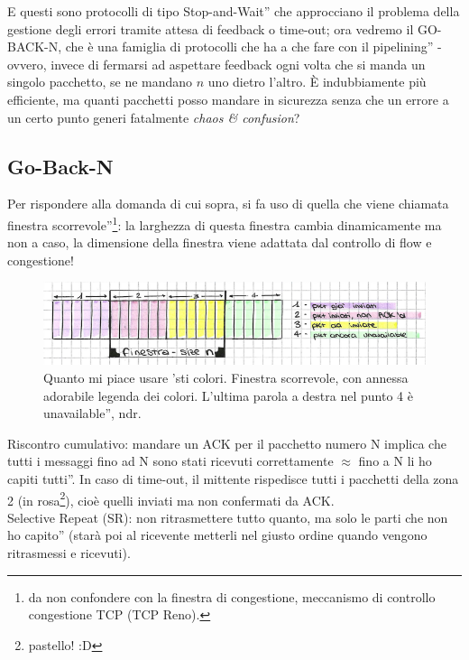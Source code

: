 \noindent E questi sono protocolli di tipo \openapex Stop-and-Wait'' che approcciano il problema della gestione degli errori tramite attesa di feedback o time-out; ora vedremo il GO-BACK-N, che è una famiglia di protocolli che ha a che fare con il \openapex pipelining'' - ovvero, invece di fermarsi ad aspettare feedback ogni volta che si manda un singolo pacchetto, se ne mandano $n$ uno dietro l'altro. È indubbiamente più efficiente, ma quanti pacchetti posso mandare in sicurezza senza che un errore a un certo punto generi fatalmente \textit{chaos \& confusion}?

\subsection*{Go-Back-N}
\noindent Per rispondere alla domanda di cui sopra, si fa uso di quella che viene chiamata \openapex finestra scorrevole''\footnote{da non confondere con la finestra di congestione, meccanismo di controllo congestione TCP (TCP Reno).}: la larghezza di questa finestra cambia dinamicamente ma non a caso, la dimensione della finestra viene adattata dal controllo di flow e congestione!

\begin{figure} [h]
    \centering
    \includegraphics[width=1\linewidth]{Figures//03/window.png}
    \caption{Quanto mi piace usare 'sti colori. Finestra scorrevole, con annessa adorabile legenda dei colori. L'ultima parola a destra nel punto 4 è \openapex unavailable'', ndr.}
    \label{fig:congwin}
\end{figure}

\noindent Riscontro cumulativo: mandare un ACK per il pacchetto numero N implica che tutti i messaggi fino ad N sono stati ricevuti correttamente $\approx$ \openapex fino a N li ho capiti tutti''. In caso di time-out, il mittente rispedisce tutti i pacchetti della zona 2 (in rosa\footnote{pastello! :D}), cioè quelli inviati ma non confermati da ACK.\\
\noindent Selective Repeat (SR): \openapex non ritrasmettere tutto quanto, ma solo le parti che non ho capito'' (starà poi al ricevente metterli nel giusto ordine quando vengono ritrasmessi e ricevuti).

